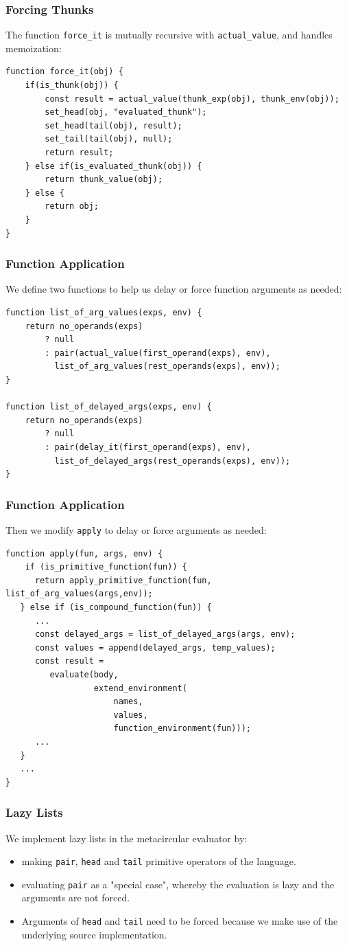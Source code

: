 \documentclass[12pt]{beamer}
\begin{document}
\begin{frame}[fragile]
\frametitle{Forcing Thunks}
The function \texttt{force\_it} is mutually recursive with \texttt{actual\_value}, and handles memoization:
\begin{lstlisting}
function force_it(obj) {
    if(is_thunk(obj)) {        
        const result = actual_value(thunk_exp(obj), thunk_env(obj));        
        set_head(obj, "evaluated_thunk");
        set_head(tail(obj), result);
        set_tail(tail(obj), null);        
        return result;        
    } else if(is_evaluated_thunk(obj)) {        
        return thunk_value(obj);        
    } else {
        return obj;
    }    
}
\end{lstlisting}
\end{frame}

\begin{frame}[fragile]
\frametitle{Function Application}
We define two functions to help us delay or force function arguments as needed:
\begin{lstlisting}
function list_of_arg_values(exps, env) {
    return no_operands(exps)
        ? null
        : pair(actual_value(first_operand(exps), env),
          list_of_arg_values(rest_operands(exps), env));
}

function list_of_delayed_args(exps, env) {
    return no_operands(exps)
        ? null
        : pair(delay_it(first_operand(exps), env),
          list_of_delayed_args(rest_operands(exps), env));
}
\end{lstlisting}
\end{frame}

\begin{frame}[fragile]
\frametitle{Function Application}
Then we modify \texttt{apply} to delay or force arguments as needed:
\begin{lstlisting}
function apply(fun, args, env) {
    if (is_primitive_function(fun)) {
      return apply_primitive_function(fun, list_of_arg_values(args,env));
   } else if (is_compound_function(fun)) {
      ...
      const delayed_args = list_of_delayed_args(args, env);
      const values = append(delayed_args, temp_values);			   
      const result =
         evaluate(body,
                  extend_environment(
                      names,
                      values,
                      function_environment(fun)));
      ...
   }
   ...
}
\end{lstlisting}
\end{frame}

\begin{frame}[fragile]
\frametitle{Lazy Lists}
We implement lazy lists in the metacircular evaluator by:
\begin{itemize}
\item<1->making  \texttt{pair}, \texttt{head} and \texttt{tail} primitive operators of the language. 
\item<2->evaluating \texttt{pair} as a "special case", whereby the evaluation is lazy and the arguments are not forced.
\item<3->Arguments of \texttt{head} and \texttt{tail} need to be forced because we make use of the underlying source implementation.
\end{itemize}
\end{frame}
\end{document}
